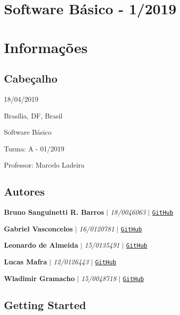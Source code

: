 

\section*{Software Básico -\/ 1/2019}

\section*{Informações}

\subsection*{Cabeçalho}


\begin{DoxyItemize}
\item 18/04/2019
\item Brasília, DF, Brasil
\item Software Básico
\item Turma\+: A -\/ 01/2019
\item Professor\+: Marcelo Ladeira
\end{DoxyItemize}

\subsection*{Autores}


\begin{DoxyItemize}
\item {\bfseries Bruno Sanguinetti R. Barros} $\vert$ {\itshape 18/0046063} $\vert$ \href{https://github.com/BrunoSNT}{\tt Git\+Hub}
\item {\bfseries Gabriel Vasconcelos} $\vert$ {\itshape 16/0120781} $\vert$ \href{https://github.com/gcvasconcelos}{\tt Git\+Hub}
\item {\bfseries Leonardo de Almeida} $\vert$ {\itshape 15/0135491} $\vert$ \href{https://github.com/leodealmeida}{\tt Git\+Hub}
\item {\bfseries Lucas Mafra} $\vert$ {\itshape 12/0126443} $\vert$ \href{https://github.com/LMafra}{\tt Git\+Hub}
\item {\bfseries Wladimir Gramacho} $\vert$ {\itshape 15/0048718} $\vert$ \href{https://github.com/wladimirgramacho}{\tt Git\+Hub}
\end{DoxyItemize}

\subsection*{Getting Started}

